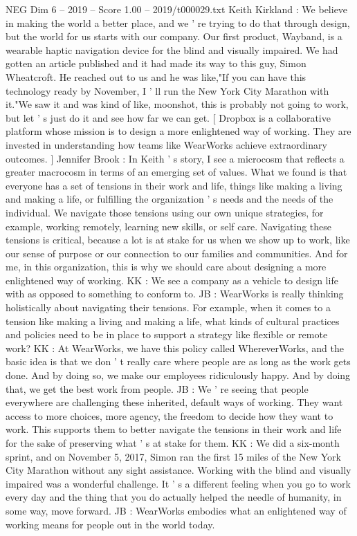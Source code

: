\begin{textsample}{NEG Dim 6 – 2019 – Score 1.00 – 2019/t000029.txt}  \label{ex:f6_neg_015}
Keith Kirkland : We believe in making the world a better place, and we ' re trying to do that through design, but the world for us starts with our company.
Our first product, Wayband, is a wearable haptic navigation device for the blind and visually impaired.
We had gotten an article published and it had made its way to this guy, Simon Wheatcroft.
He reached out to us and he was like,"If you can have this technology ready by November, I ' ll run the New York City Marathon with it."We saw it and was kind of like, moonshot, this is probably not going to work, but let ' s just do it and see how far we can get. [ Dropbox is a collaborative platform whose mission is to design a more enlightened way of working.
They are invested in understanding how teams like WearWorks achieve extraordinary outcomes. ] Jennifer Brook : In Keith ' s story, I see a microcosm that reflects a greater macrocosm in terms of an emerging set of values.
What we found is that everyone has a set of tensions in their work and life, things like making a living and making a life, or fulfilling the organization ' s needs and the needs of the individual.
We navigate those tensions using our own unique strategies, for example, working remotely, learning new skills, or self care.
Navigating these tensions is critical, because a lot is at stake for us when we show up to work, like our sense of purpose or our connection to our families and communities.
And for me, in this organization, this is why we should care about designing a more enlightened way of working.
KK : We see a company as a vehicle to design life with as opposed to something to conform to.
JB : WearWorks is really thinking holistically about navigating their tensions.
For example, when it comes to a tension like making a living and making a life, what kinds of cultural practices and policies need to be in place to support a strategy like flexible or remote work?
KK : At WearWorks, we have this policy called WhereverWorks, and the basic idea is that we don ' t really care where people are as long as the work gets done.
And by doing so, we make our employees ridiculously happy.
And by doing that, we get the best work from people.
JB : We ' re seeing that people everywhere are challenging these inherited, default ways of working.
They want access to more choices, more agency, the freedom to decide how they want to work.
This supports them to better navigate the tensions in their work and life for the sake of preserving what ' s at stake for them.
KK : We did a six-month sprint, and on November 5, 2017, Simon ran the first 15 miles of the New York City Marathon without any sight assistance.
Working with the blind and visually impaired was a wonderful challenge.
It ' s a different feeling when you go to work every day and the thing that you do actually helped the needle of humanity, in some way, move forward.
JB : WearWorks embodies what an enlightened way of working means for people out in the world today.

\end{textsample}
